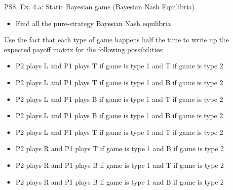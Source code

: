 \begin{frame}{PS8, Ex. 4.a: Static Bayesian game (Bayesian Nash Equilibria)}
\begin{itemize}
    \item[] Find all the pure-strategy Bayesian Nash equilibria
\end{itemize}
Use the fact that each type of game happens half the time to write up the expected payoff matrix for the following possibilities:
\begin{itemize}
    \item P2 plays L and P1 plays T if game is type 1 and T if game is type 2
    \item P2 plays L and P1 plays T if game is type 1 and B if game is type 2
    \item P2 plays L and P1 plays B if game is type 1 and T if game is type 2
    \item P2 plays L and P1 plays B if game is type 1 and B if game is type 2
    \item P2 plays L and P1 plays T if game is type 1 and T if game is type 2
    \item P2 plays R and P1 plays T if game is type 1 and B if game is type 2
    \item P2 plays R and P1 plays B if game is type 1 and T if game is type 2
    \item P2 plays R and P1 plays B if game is type 1 and B if game is type 2
\end{itemize}
    \vfill\null\null
\end{frame}

